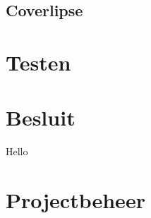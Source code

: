 \documentclass[pdftex12pt, a4paper]{article}
\begin{document}
\subsection{Coverlipse}

\newpage

\section{Testen}

\newpage

\section{Besluit}

Hello 


\newpage

\section{Projectbeheer}
\end{document}
